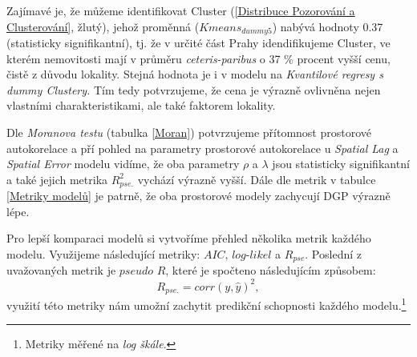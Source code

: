 \documentclass[11pt, a4paper]{article}
\begin{document}
Zajímavé je, že můžeme identifikovat Cluster (\ref{Distribuce Pozorování a Clusterování}, žlutý), jehož proměnná (\textit{$Kmeans_{dummy5}$}) nabývá hodnoty 0.37 (statisticky signifikantní), tj. že v určité část Prahy idendifikujeme Cluster, ve kterém nemovitosti mají v průměru \textit{ceteris-paribus} o 37 \% procent vyšší cenu, čistě z důvodu lokality. Stejná hodnota je i v modelu na \textit{Kvantilové regresy s dummy Clustery.} Tím tedy potvrzujeme, že cena je výrazně ovlivněna nejen vlastními charakteristikami, ale také faktorem lokality.

Dle \textit{Moranova testu} (tabulka \ref{Moran}) potvrzujeme přítomnost prostorové autokorelace a pří pohled na parametry prostorové autokorelace u \textit{Spatial Lag} a \textit{Spatial Error} modelu vidíme, že oba parametry \textit{$\rho$} a \textit{$\lambda$} jsou statisticky signifikantní a také jejich metrika \textit{$R_{pse.}^{2}$} vychází výrazně vyšší. Dále dle metrik v tabulce \ref{Metriky modelů} je patrně, že oba prostorové modely zachycují DGP výrazně lépe.

Pro lepší komparaci modelů si vytvoříme přehled několika metrik každého modelu. Využijeme následující metriky: $\textit{AIC, log-likel}$ a $R_{pse}$. Poslední z uvažovaných metrik je $\textit{pseudo R}$, které je spočteno následujícím způsobem:
$$R_{pse.} = corr(y, \hat y)^2,$$
využití této metriky nám umožní zachytit predikční schopnosti každého modelu.\footnote{Metriky měřené na \textit{log škále}.}

\begin{table}[!htbp] \centering 
  \caption{Metriky modelu} 
  \label{Metriky modelů} 
\end{table} 
\end{document}
